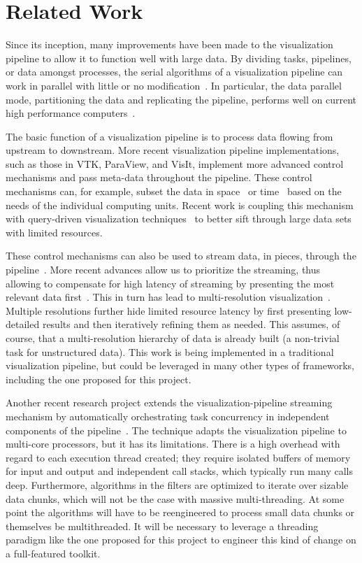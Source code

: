 \documentclass{vgtc}                          %
\newcommand*{\lcite}[1]{~\cite{#1}}
\begin{document}
\section{Related Work}
\label{sec:RelatedWork}

Since its inception, many improvements have been made to the visualization
pipeline to allow it to function well with large data.  By dividing tasks,
pipelines, or data amongst processes, the serial algorithms of a
visualization pipeline can work in parallel with little or no
modification\lcite{Ahrens00}.  In particular, the data parallel
mode, partitioning the data and replicating the pipeline, performs
well on current high performance computers\lcite{Cedilnik06}.

The basic function of a visualization pipeline is to process data flowing
from upstream to downstream.  More recent visualization pipeline
implementations, such as those in VTK, ParaView, and VisIt, implement more
advanced control mechanisms and pass meta-data throughout the pipeline.
These control mechanisms can, for example, subset the data in
space\lcite{Childs05} or time\lcite{Biddiscombe07} based on the needs of
the individual computing units.  Recent work is coupling this mechanism
with query-driven visualization techniques\lcite{Gosink08} to better sift
through large data sets with limited resources.

These control mechanisms can also be used to stream data, in pieces,
through the pipeline\lcite{Ahrens01}.  More recent advances allow us to
prioritize the streaming, thus allowing to compensate for high latency of
streaming by presenting the most relevant data first\lcite{Ahrens07}.  This
in turn has lead to multi-resolution
visualization\lcite{Pascucci01,Woodring09}.  Multiple resolutions further
hide limited resource latency by first presenting low-detailed results and
then iteratively refining them as needed.  This assumes, of course, that a
multi-resolution hierarchy of data is already built (a non-trivial task for
unstructured data).  This work is being implemented in a traditional
visualization pipeline, but could be leveraged in many other types of
frameworks, including the one proposed for this project.

Another recent research project extends the visualization-pipeline
streaming mechanism by automatically orchestrating task concurrency in
independent components of the pipeline\lcite{Vo09}.  The technique adapts
the visualization pipeline to multi-core processors, but it has its
limitations.  There is a high overhead with regard to each execution thread
created; they require isolated buffers of memory for input and output and
independent call stacks, which typically run many calls deep.  Furthermore,
algorithms in the filters are optimized to iterate over sizable data
chunks, which will not be the case with massive multi-threading.  At some
point the algorithms will have to be reengineered to process small data
chunks or themselves be multithreaded.  It will be necessary to leverage a
threading paradigm like the one proposed for this project to engineer this
kind of change on a full-featured toolkit.
\end{document}
